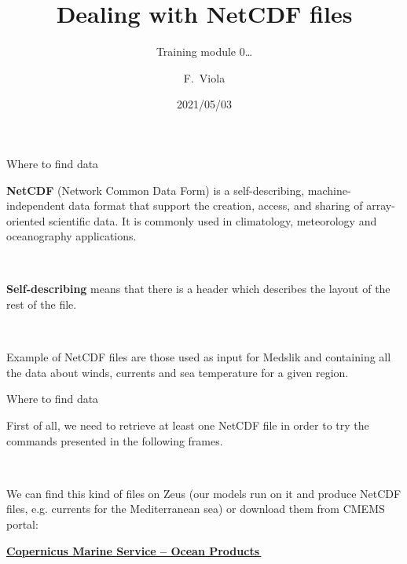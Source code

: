\documentclass[9pt]{beamer}
\title{Dealing with NetCDF files}
\subtitle{Training module 0\dots}
\date{2021/05/03}
\begin{document}
\author[Viola] %
{F.~Viola}



\maketitle

\begin{frame}[fragile]{Where to find data}

\textbf{NetCDF} (Network Common Data Form) is a self-describing, machine-independent data format that support the creation, access, and sharing of array-oriented scientific data. It is commonly used in climatology, meteorology and oceanography applications.

\

\textbf{Self-describing} means that there is a header which describes the layout of the rest of the file. 

\ 

\pause Example of NetCDF files are those used as input for Medslik and containing all the data about winds, currents and sea temperature for a given region.

\end{frame}


\begin{frame}[fragile]{Where to find data}

First of all, we need to retrieve at least one NetCDF file in order to try the commands presented in the following frames.

\ 

\pause We can find this kind of files on Zeus (our models run on it and produce NetCDF files, e.g. currents for the Mediterranean sea) or download them from CMEMS portal:

\begin{center}
\textbf{    \href{https://resources.marine.copernicus.eu/?option=com_csw&task=results}{Copernicus Marine Service -- Ocean Products\, \faExternalLink}}
\end{center}

\end{frame}
\end{document}
